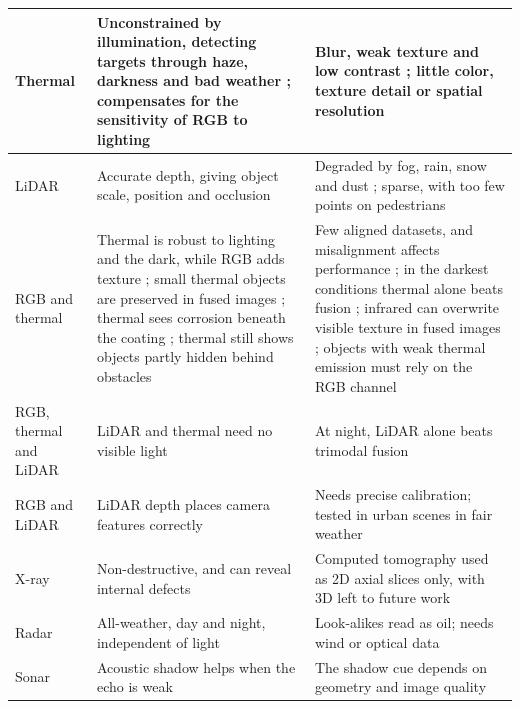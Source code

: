 {\begin{xltabular}{\textwidth}{>{\RaggedRight\arraybackslash}p{2.4cm}>{\RaggedRight\arraybackslash}X>{\RaggedRight\arraybackslash}X}
\midrule
Thermal & Unconstrained by illumination, detecting targets through haze, darkness and bad weather \citep{Liu2026c,Wen2025}; compensates for the sensitivity of RGB to lighting \citep{Wang2024b} & Blur, weak texture and low contrast \citep{Liu2026c}; little color, texture detail or spatial resolution \citep{Wang2024b,Wen2025} \\
\midrule
LiDAR & Accurate depth, giving object scale, position and occlusion \citep{Naich2024,Prasanth2026,Soumya2026} & Degraded by fog, rain, snow and dust \citep{Naich2024,Soumya2026}; sparse, with too few points on pedestrians \citep{Prasanth2026} \\
\midrule
RGB and thermal & Thermal is robust to lighting and the dark, while RGB adds texture \citep{Hou2024,Jiang2024}; small thermal objects are preserved in fused images \citep{Chang2024}; thermal sees corrosion beneath the coating \citep{Lim2021}; thermal still shows objects partly hidden behind obstacles \citep{Wang2026b} & Few aligned datasets, and misalignment affects performance \citep{Hou2024}; in the darkest conditions thermal alone beats fusion \citep{Jiang2024}; infrared can overwrite visible texture in fused images \citep{Chang2024}; objects with weak thermal emission must rely on the RGB channel \citep{Wang2026b} \\
\midrule
RGB, thermal and LiDAR & LiDAR and thermal need no visible light \citep{Tran2025} & At night, LiDAR alone beats trimodal fusion \citep{Tran2025} \\
\midrule
RGB and LiDAR & LiDAR depth places camera features correctly \citep{Cheng2025} & Needs precise calibration; tested in urban scenes in fair weather \citep{Cheng2025} \\
\midrule
X-ray & Non-destructive, and can reveal internal defects \citep{Gong2022} & Computed tomography used as 2D axial slices only, with 3D left to future work \citep{Morita2024} \\
\midrule
Radar & All-weather, day and night, independent of light \citep{Zhao2026} & Look-alikes read as oil; needs wind or optical data \citep{Zhao2026} \\
\midrule
Sonar & Acoustic shadow helps when the echo is weak \citep{He2026} & The shadow cue depends on geometry and image quality \citep{He2026} \\
\end{xltabular}
}

